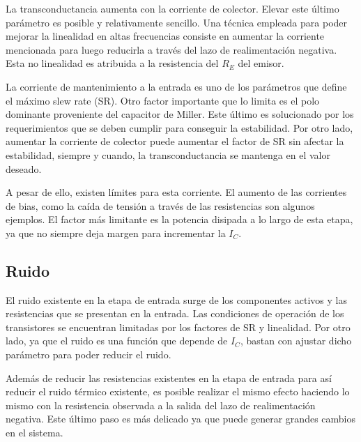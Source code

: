 La transconductancia aumenta con la corriente de colector. Elevar este último parámetro es posible y relativamente sencillo. Una técnica empleada para poder mejorar la linealidad en altas frecuencias consiste en aumentar la corriente mencionada para luego reducirla a través del lazo de realimentación negativa. Esta no linealidad es atribuida a la resistencia del $R_E$ del emisor.%

La corriente de mantenimiento a la entrada es uno de los parámetros que define el máximo slew rate (SR). Otro factor importante que lo limita es el polo dominante proveniente del capacitor de Miller. Este último es solucionado por los requerimientos que se deben cumplir para conseguir la estabilidad. Por otro lado, aumentar la corriente de colector puede aumentar el factor de SR sin afectar la estabilidad, siempre y cuando, la transconductancia se mantenga en el valor deseado. 

A pesar de ello, existen límites para esta corriente. El aumento de las corrientes de bias, como la caída de tensión a través de las resistencias son algunos ejemplos. El factor más limitante es la potencia disipada a lo largo de esta etapa, ya que no siempre deja margen para incrementar la $I_C$. 

\subsection{Ruido}
El ruido existente en la etapa de entrada surge de los componentes activos y las resistencias que se presentan en la entrada. Las condiciones de operación de los transistores se encuentran limitadas por los factores de SR y linealidad. Por otro lado, ya que el ruido es una función que depende de $I_C$, bastan con ajustar dicho parámetro para poder reducir el ruido. 

Además de reducir las resistencias existentes en la etapa de entrada para así reducir el ruido térmico existente, es posible realizar el mismo efecto haciendo lo mismo con la resistencia observada a la salida del lazo de realimentación negativa. Este último paso es más delicado ya que puede generar grandes cambios en el sistema.


